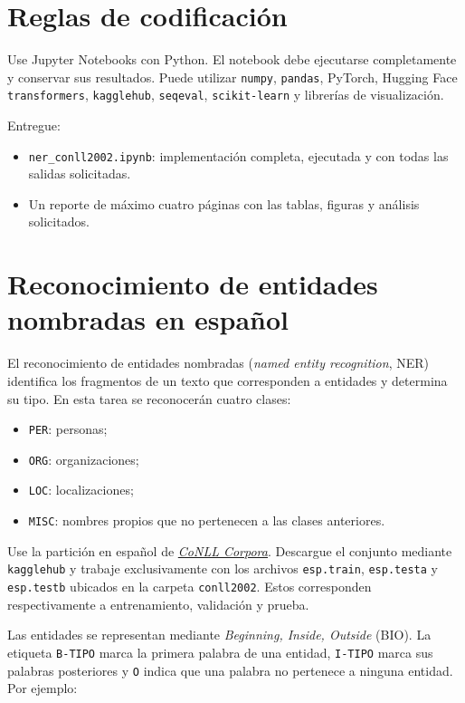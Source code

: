 \documentclass[11pt,a4paper]{article}
\begin{document}
\section*{Reglas de codificación}

Use Jupyter Notebooks con Python. El notebook debe ejecutarse completamente y conservar sus resultados. Puede utilizar \texttt{numpy}, \texttt{pandas}, PyTorch, Hugging Face \texttt{transformers}, \texttt{kagglehub}, \texttt{seqeval}, \texttt{scikit-learn} y librerías de visualización.

Entregue:
\begin{itemize}
    \item \texttt{ner\_conll2002.ipynb}: implementación completa, ejecutada y con todas las salidas solicitadas.
    \item Un reporte de máximo cuatro páginas con las tablas, figuras y análisis solicitados.
\end{itemize}

\section*{Reconocimiento de entidades nombradas en español}

El reconocimiento de entidades nombradas (\textit{named entity recognition}, NER) identifica los fragmentos de un texto que corresponden a entidades y determina su tipo. En esta tarea se reconocerán cuatro clases:
\begin{itemize}
    \item \texttt{PER}: personas;
    \item \texttt{ORG}: organizaciones;
    \item \texttt{LOC}: localizaciones;
    \item \texttt{MISC}: nombres propios que no pertenecen a las clases anteriores.
\end{itemize}

Use la partición en español de \href{https://www.clips.uantwerpen.be/conll2002/ner/}{\textit{CoNLL Corpora}}. Descargue el conjunto mediante \texttt{kagglehub} y trabaje exclusivamente con los archivos \texttt{esp.train}, \texttt{esp.testa} y \texttt{esp.testb} ubicados en la carpeta \texttt{conll2002}. Estos corresponden respectivamente a entrenamiento, validación y prueba.

Las entidades se representan mediante \textit{Beginning, Inside, Outside} (BIO). La etiqueta \texttt{B-TIPO} marca la primera palabra de una entidad, \texttt{I-TIPO} marca sus palabras posteriores y \texttt{O} indica que una palabra no pertenece a ninguna entidad. Por ejemplo:
\end{document}
